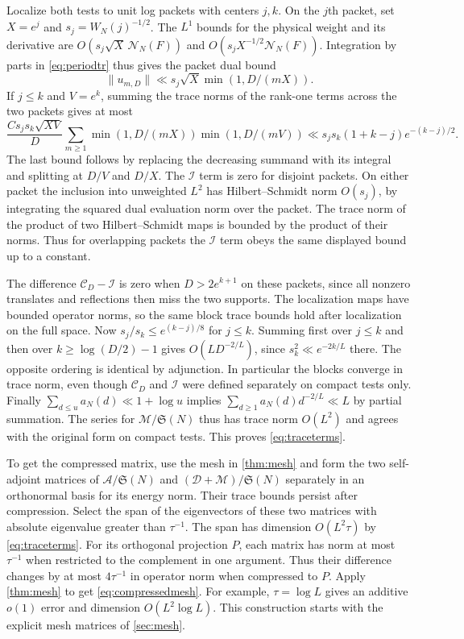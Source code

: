 \documentclass[11pt,a4paper]{article}
\numberwithin{equation}{section}
\newcommand{\SSS}{\mathfrak S}
\newcommand{\NN}{\mathcal N_N}
\begin{document}
Localize both tests to unit log packets with centers $j,k$.
On the $j$th packet, set $X=e^j$ and $s_j=W_N(j)^{-1/2}$.
The $L^1$ bounds for the physical weight and its derivative
are $O(s_j\sqrt X\,\NN(F))$ and
$O(s_jX^{-1/2}\NN(F))$. Integration by parts in
\cref{eq:periodtr} thus gives the packet dual bound
\[
 \|u_{m,D}\|\ll s_j\sqrt X\min(1,D/(mX)).
\]
If $j\le k$ and $V=e^k$, summing the trace norms of the
rank-one terms across the two packets gives at most
\[
 \frac{Cs_js_k\sqrt{XV}}{D}
 \sum_{m\ge1}\min(1,D/(mX))\min(1,D/(mV))
    \ll s_js_k(1+k-j)e^{-(k-j)/2}.
\]
The last bound follows by replacing the decreasing summand
with its integral and splitting at $D/V$ and $D/X$.
The $\mathcal I$ term is zero for disjoint packets.
On either packet the inclusion into unweighted $L^2$
has Hilbert--Schmidt norm $O(s_j)$, by integrating
the squared dual evaluation norm over the packet.
The trace norm of the product of two Hilbert--Schmidt
maps is bounded by the product of their norms.
Thus for overlapping packets the $\mathcal I$ term
obeys the same displayed bound up to a constant.

The difference $\mathcal C_D-\mathcal I$ is zero when
$D>2e^{k+1}$ on these packets, since all nonzero translates
and reflections then miss the two supports.
The localization maps have bounded operator norms, so the
same block trace bounds hold after localization on the full
space. Now $s_j/s_k\le e^{(k-j)/8}$ for $j\le k$.
Summing first over $j\le k$ and then over
$k\ge\log(D/2)-1$ gives $O(LD^{-2/L})$, since
$s_k^2\ll e^{-2k/L}$ there. The opposite ordering is
identical by adjunction. In particular the blocks converge
in trace norm, even though $\mathcal C_D$ and $\mathcal I$
were defined separately on compact tests only.
Finally $\sum_{d\le u}a_N(d)\ll1+\log u$ implies
$\sum_{d\ge1}a_N(d)d^{-2/L}\ll L$ by partial summation.
The series for $\mathcal M/\SSS(N)$ thus has trace norm
$O(L^2)$ and agrees with the original form on compact
tests. This proves \cref{eq:traceterms}.

To get the compressed matrix, use the mesh in
\cref{thm:mesh} and form the two self-adjoint matrices
of $\mathcal A/\SSS(N)$ and
$(\mathcal D+\mathcal M)/\SSS(N)$ separately in an
orthonormal basis for its energy norm. Their trace bounds
persist after compression. Select the span of the
eigenvectors of these two matrices with absolute eigenvalue
greater than $\tau^{-1}$. The span has dimension
$O(L^2\tau)$ by \cref{eq:traceterms}. For its orthogonal
projection $P$, each matrix has norm at most
$\tau^{-1}$ when restricted to the complement in one
argument. Thus their difference changes by at most
$4\tau^{-1}$ in operator norm when compressed to $P$.
Apply \cref{thm:mesh} to get \cref{eq:compressedmesh}.
For example, $\tau=\log L$ gives an additive $o(1)$
error and dimension $O(L^2\log L)$. This construction
starts with the explicit mesh matrices of \cref{sec:mesh}.
\end{document}
